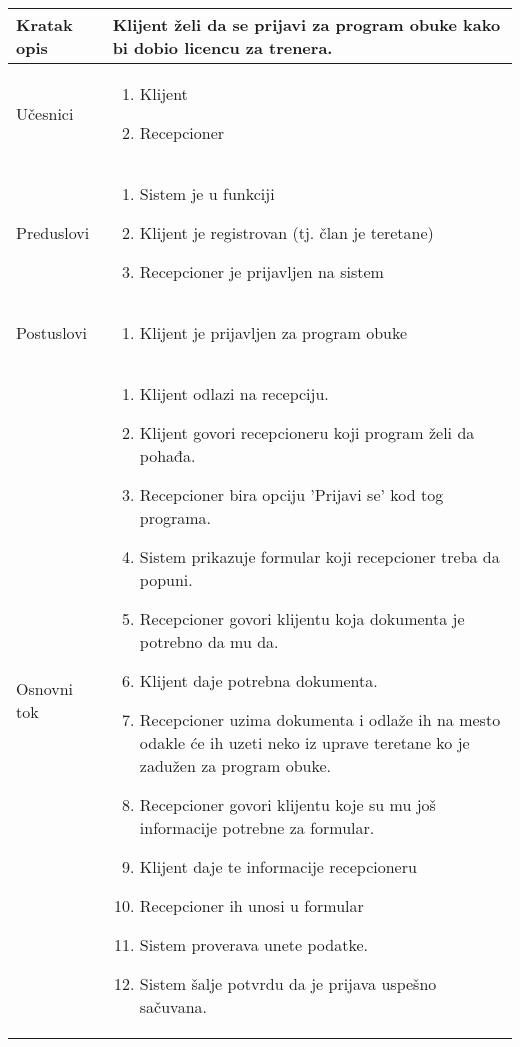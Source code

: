 \documentclass[../../main.tex]{subfiles}
\begin{document}
\begin{longtable}{| p{} | p{} |} 
\hline
    Kratak opis & Klijent želi da se prijavi za program obuke kako bi dobio licencu za trenera.  \\ 
\hline    
    Učesnici &
    \begin{enumerate}
        \item Klijent
        \item Recepcioner
    \end{enumerate}\\
\hline
   Preduslovi &
   \begin{enumerate}
        \item Sistem je u funkciji
        \item Klijent je registrovan (tj. član je teretane)
        \item Recepcioner je prijavljen na sistem
    \end{enumerate}\\
\hline  
    Postuslovi & 
    \begin{enumerate}
        \item Klijent je prijavljen za program obuke
    \end{enumerate} \\
\hline
    Osnovni tok & 
    \begin{enumerate}
        \item Klijent odlazi na recepciju.
        \item Klijent govori recepcioneru koji program želi da pohađa.
        \item Recepcioner bira opciju 'Prijavi se' kod tog programa.
        \item Sistem prikazuje formular koji recepcioner treba da popuni.
        \item Recepcioner govori klijentu koja dokumenta je potrebno da mu da.
        \item Klijent daje potrebna dokumenta.
        \item Recepcioner uzima dokumenta i odlaže ih na mesto odakle će ih uzeti neko iz uprave teretane ko je zadužen za program obuke.
        \item Recepcioner govori klijentu koje su mu još informacije potrebne za formular.
        \item Klijent daje te informacije recepcioneru
        \item Recepcioner ih unosi u formular
        \item Sistem proverava unete podatke.
        \item Sistem šalje potvrdu da je prijava uspešno sačuvana.

\end{enumerate}
\end{longtable}
\end{document}
